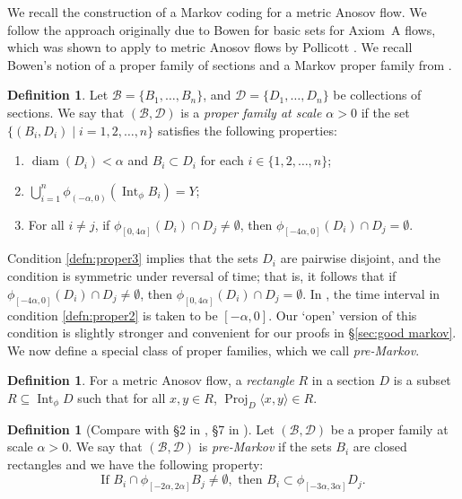 \documentclass[10pt]{amsart}
\let\mathcal\mathscr
\let\sep\mid
\theoremstyle{definition}
\newtheorem{defn}[thm]{Definition}
\numberwithin{equation}{section}
\DeclareMathOperator{\diam}{diam}
\DeclareMathOperator{\Int}{Int}
\DeclareMathOperator{\Proj}{Proj}
\newcommand\DDD{\mathcal D}
\newcommand\BBB{\mathcal B}
\begin{document}
We recall the construction of a Markov coding for a metric Anosov flow. We follow the approach originally due to Bowen \cite{bowen-symbolic} for basic sets for Axiom~A flows, which was shown to apply to metric Anosov flows by Pollicott \cite{pollicott}. We recall Bowen's notion of a proper family of sections and a Markov proper family from \cite{bowen-symbolic}.

\begin{defn}\label{defn:proper}
Let $\BBB=\{B_1, \ldots, B_n\}$, and $\DDD=\{D_1, \ldots, D_n\}$ be collections of sections. We say that $(\BBB, \DDD)$ is a \emph{proper family at scale $\alpha>0$} if the set \hbox{$\{ (B_i, D_i) \sep i = 1, 2, \ldots, n \}$} satisfies the following properties:
\begin{enumerate}
\item\label{defn:proper1} $\diam(D_i)< \alpha$ and $B_i \subset D_i$ for each $i \in \{1, 2, \ldots, n\}$;
\item\label{defn:proper2} $\bigcup_{i=1}^n\phi_{(-\alpha, 0)} (\Int_\phi B_i)=Y$;
\item\label{defn:proper3} For all $i\neq j$, if $\phi_{[0, 4\alpha]}(D_i) \cap D_j \neq \emptyset$, then $\phi_{[-4\alpha, 0]}(D_i) \cap D_j = \emptyset$.
\end{enumerate}
\end{defn}

Condition \eqref{defn:proper3} implies that the sets $D_i$ are pairwise disjoint, and the condition is symmetric under reversal of time; that is, it follows that if $\phi_{[-4\alpha, 0]}(D_i) \cap D_j \neq \emptyset$, then $\phi_{[0, 4\alpha]}(D_i) \cap D_j = \emptyset$. In \cite{bowen-symbolic, pollicott}, the time interval in condition \eqref{defn:proper2} is taken to be $[-\alpha, 0]$. Our `open' version of this condition is slightly stronger and convenient for our proofs in \S\ref {sec:good markov}. We now define a special class of proper families, which we call \emph{pre-Markov}.

\begin{defn}\label{def:rectangle}
For a metric Anosov flow, a \emph{rectangle} $R$ in a section $D$ is a subset $R \subseteq \Int_\phi D$ such that for all $x,y \in R$, $\Proj_{D} \langle x,y\rangle \in R$.
\end{defn}

\begin{defn}[Compare with \S 2 in \cite{pollicott}, \S 7 in \cite{bowen-symbolic}]\label{defn:pollicott}
Let $(\BBB, \DDD)$ be a proper family at scale $\alpha>0$. We say that $(\BBB, \DDD)$ is \emph{pre-Markov} if the sets $B_i$ are closed rectangles and we have the following property:
\begin{equation} \label{premarkov}
\mbox{If }B_i \cap \phi_{[-2 \alpha, 2 \alpha]}B_j \neq \emptyset, \mbox{ then } B_i \subset \phi_{[-3\alpha, 3\alpha]} D_j.
\end{equation}
\end{defn}
\end{document}
